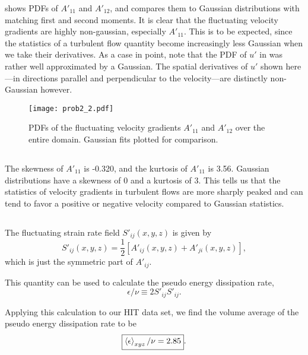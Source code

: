 \documentclass[11pt]{article}
\begin{document}
 shows PDFs of $A'_{11}$ and $A'_{12}$, and compares them to Gaussian distributions with matching first and second moments. It is clear that the fluctuating velocity gradients are highly non-gaussian, especially $A'_{11}$. This is to be expected, since the statistics of a turbulent flow quantity become increasingly less Gaussian when we take their derivatives. As a case in point, note that the PDF of $u'$ in  was rather well approximated by a Gaussian. The spatial derivatives of $u'$ shown here---in directions parallel and perpendicular to the velocity---are distinctly non-Gaussian however.

\begin{figure}[t]
\centering
\texttt{[image: prob2\_2.pdf]}
\\[6pt]
\caption{PDFs of the fluctuating velocity gradients $A'_{11}$ and $A'_{12}$ over the entire domain. Gaussian fits plotted for comparison.}
\label{fig:prob_2_2_AijPrime_PDFs}
\end{figure}

\subsection{}

The skewness of $A'_{11}$ is -0.320, and the kurtosis of $A'_{11}$ is 3.56. Gaussian distributions have a skewness of 0 and a kurtosis of 3. This tells us that the statistics of velocity gradients in turbulent flows are more sharply peaked and can tend to favor a positive or negative velocity compared to Gaussian statistics.

\subsection{}

The fluctuating strain rate field $S'_{ij}(x,y,z)$ is given by
\begin{equation}
S'_{ij}(x,y,z)
=
\frac{1}{2} \left[ A'_{ij}(x,y,z) + A'_{ji}(x,y,z) \right]
,
\end{equation}
which is just the symmetric part of $A'_{ij}$.

This quantity can be used to calculate the pseudo energy dissipation rate,
\begin{equation}
\epsilon/\nu \equiv 2 S'_{ij} S'_{ij}
.
\end{equation}

Applying this calculation to our HIT data set, we find the volume average of the pseudo energy dissipation rate to be
\[
\boxed{\left< \epsilon \right>_{xyz}/\nu = 2.85}
.
\]
\end{document}

